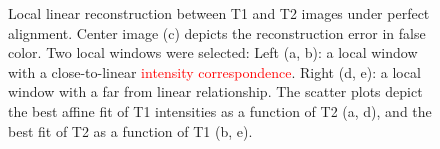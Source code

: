\begin{figure}[t!]
    \caption{{\small Local linear reconstruction between T1 and T2 images under perfect alignment. Center image (c) depicts the reconstruction error in false color. Two local windows were selected: Left (a, b): a local window with a close-to-linear \textcolor{red}{intensity correspondence}. Right (d, e): a local window with a far from linear relationship. The scatter plots depict the best affine fit of T1 intensities as a function of T2 (a, d), and the best fit of T2 as a function of T1 (b, e).}}
\label{fig:llr_test}\figcloser
\end{figure}





